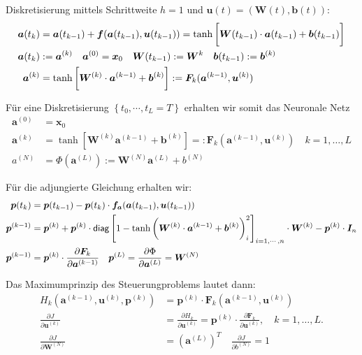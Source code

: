 \documentclass[a4paper, 12pt]{scrartcl}
\begin{document}
Diskretisierung mittels Schrittweite $h=1$ und $\bm{u}(t) = (\bm{W}(t), \bm{b}(t))$:
\begin{align*}
    \bm{a}(t_k) 
    &= 
    \bm{a}(t_{k-1}) + \bm{f}(\bm{a}(t_{k-1}), \bm{u}(t_{k-1})) 
    = 
    \tanh
    \left[
        \vphantom{\int}
        \bm{W}(t_{k-1}) \cdot \bm{a}(t_{k-1}) + \bm{b}(t_{k-1})
    \right]  
    \\
    \bm{a}(t_k) &:= \bm{a}^{(k)} 
    \quad
    \bm{a}^{(0)} = \bm{x}_0
    \quad
    \bm{W}(t_{k-1}) := \bm{W}^{k} 
    \quad
    \bm{b}(t_{k-1}) := \bm{b}^{(k)}
    \\
    \bm{a}^{(k)}
    &=
    \tanh
    \left[
        \vphantom{\int}
        \bm{W}^{(k)} \cdot \bm{a}^{(k-1)} + \bm{b}^{(k)}
    \right]
    :=
    \bm{F}_k (\bm{a}^{(k-1)}, \bm{u}^{(k)})
\end{align*}

Für eine Diskretisierung $\left\{t_0 , \cdots ,t_L =T \right\}$ erhalten wir somit das Neuronale Netz
\begin{align*}
    \bm{a}^{(0)} &= \bm{x}_0
    \\
    \bm{a}^{(k)} &= 
    \tanh
    \left[
        \bm{W}^{(k)}\bm{a}^{(k-1)} + \bm{b}^{(k)}
    \right]
    =: \bm{F}_k(\bm{a}^{(k-1)}, \bm{u}^{(k)})
    \quad
    k = 1,\dots, L
    \\
    a^{(N)} &= \Phi\left(\bm{a}^{(L)}\right) := \bm{W}^{(N)}\bm{a}^{(L)} + b^{(N)}
\end{align*}

Für die adjungierte Gleichung erhalten wir:
\begin{align*}
    \bm{p}(t_{k}) &= \bm{p}(t_{k-1}) - \bm{p}(t_{k}) 
    \cdot \bm{f}_{\bm{a}}(\bm{a}(t_{k-1}),\bm{u}(t_{k-1}))
    \\
    \bm{p}^{(k-1)} 
    &= 
    \bm{p}^{(k)} 
    + 
    \bm{p}^{(k)}
    \cdot
    \textsf{diag}
    \left[
        \vphantom{\int}
        1 - 
        \tanh
        \left(
            \vphantom{\int}
            \bm{W}^{(k)} \cdot \bm{a}^{(k-1)} + \bm{b}^{(k)}
        \right)_i^2
    \right]_{i=1,\cdots , n}
    \cdot
    \bm{W}^{(k)}
    - 
    \bm{p}^{(k)}
    \cdot 
    \bm{I}_n
    \\
    \bm{p}^{(k-1)} 
    &=
    \bm{p}^{(k)}
    \cdot
    \frac{\partial \bm{F}_k}{\partial \bm{a}^{(k-1)}}
    \quad
    \bm{p}^{(L)} = \frac{\partial \Phi}{\partial \bm{a}^{(L)}} = \bm{W}^{(N)}
\end{align*}

Das Maximumprinzip des Steuerungproblems lautet dann: 
%
\begin{align*}
    H_k \left(\bm{a}^{(k-1)}, \bm{u}^{(k)}, \bm{p}^{(k)}\right) 
    &= 
    \bm{p}^{(k)} \cdot \bm{F}_k(\bm{a}^{(k-1)}, \bm{u}^{(k)})
    \\
    \frac{\partial J}{\partial \bm{u}^{(k)}} 
    &= 
    \frac{\partial H_k}{\partial \bm{u}^{(k)}} 
    = \bm{p}^{(k)} \cdot \frac{\partial \bm{F}_k}{\partial \bm{u}^{(k)}}, 
    \quad 
    k = 1,\dots,L.
    \\
    \frac{\partial J}{\partial \bm{W}^{(N)}} 
    &=
    (\bm{a}^{(L)})^T
    \quad
    \frac{\partial J}{\partial b^{(N)}} = 1
\end{align*}
\end{document}

